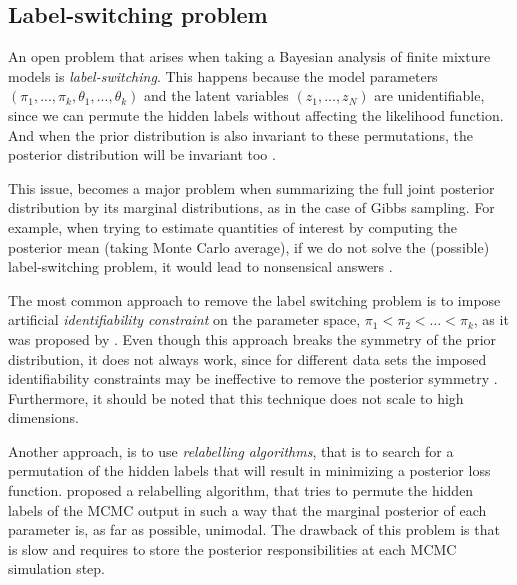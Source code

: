 \subsection{Label-switching problem} \label{fdmm-relable-subsect}
An open problem that arises when taking a Bayesian analysis of finite mixture models is \emph{label-switching}. This happens because the model parameters $(\pi_{1},...,\pi_{k},\theta_{1},...,\theta_{k})$ and the latent variables $(z_{1},...,z_{N})$ are unidentifiable, since we can permute the hidden labels without affecting the likelihood function. And when the prior distribution is also invariant to these permutations, the posterior distribution will be invariant too \citep{Rufo2006}.

This issue, becomes a major problem when summarizing the full joint posterior distribution by its marginal distributions, as in the case of Gibbs sampling. For example, when trying to estimate quantities of interest by computing the posterior mean (\ie taking Monte Carlo average), if we do not solve the (possible) label-switching problem, it would lead to nonsensical answers \citep{Stephens2000}. 

The most common approach to remove the label switching problem is to impose artificial \emph{identifiability constraint} on the parameter space, \eg $\pi_{1} < \pi_{2} < ... < \pi_{k}$, as it was proposed by \citet{Richardson1997}. Even though this approach breaks the symmetry of the prior distribution, it does not always work, since for different data sets the imposed identifiability constraints may be ineffective to remove the posterior symmetry \citep{Celeux2000}. Furthermore, it should be noted that this technique does not scale to high dimensions. 

Another approach, is to use \emph{relabelling algorithms}, that is to search for a permutation of the hidden labels that will result in minimizing a posterior loss function. \citet{Stephens2000} proposed a relabelling algorithm, that tries to permute the hidden labels of the MCMC output in such a way that the marginal posterior of each parameter is, as far as possible, unimodal. The drawback of this problem is that is slow and requires to store the posterior responsibilities at each MCMC simulation step. 